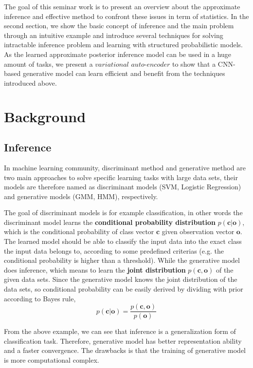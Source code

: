 \documentclass[conference]{IEEEtran}
\begin{document}
The goal of this seminar work is to present an overview about the approximate inference and effective method to confront these issues in term of statistics. In the second section, we show the basic concept of inference and the main problem through an intuitive example and introduce several techniques for solving intractable inference problem and learning with structured probabilistic models. As the learned approximate posterior inference model can be used in a huge amount of tasks, we present a $variational$ $auto$-$encoder$ to show that a CNN-based generative model can learn efficient and benefit from the techniques introduced above.

\section{Background}
\subsection{Inference}
In machine learning community, discriminant method and generative method are two main approaches to solve specific learning tasks with large data sets, their models are therefore named as discriminant models (SVM, Logistic Regression) and generative models (GMM, HMM), respectively. 

The goal of discriminant models is for example classification, in other words the discriminant model learns the \textbf{conditional probability distribution} $p(\boldsymbol{c} | \boldsymbol{o})$, which is the conditional probability of class vector $\boldsymbol{c}$ given observation vector $\boldsymbol{o}$. The learned model should be able to classify the input data into the exact class the input data belongs to, according to some predefined criterias (e.g. the conditional probability is higher than a threshold). While the generative model does inference, which means to learn the \textbf{joint distribution} $p(\boldsymbol{c},\boldsymbol{o})$ of the given data sets. Since the generative model knows the joint distribution of the data sets, so conditional probability can be easily derived by dividing with prior according to Bayes rule, 
\begin{equation}
p(\boldsymbol{c} | \boldsymbol{o}) = \frac{p(\boldsymbol{c}, \boldsymbol{o})}{p(\boldsymbol{o})}
\end{equation} 

From the above example, we can see that inference is a generalization form of classification task. Therefore, generative model has better representation ability and a faster convergence. The drawbacks is that the training of generative model is more computational complex. \cite{ng2002discriminative}
\end{document}
